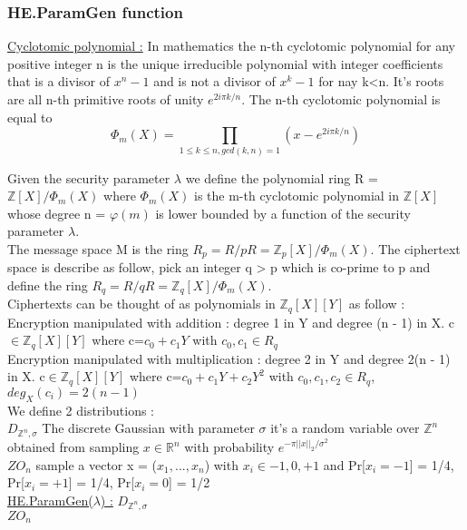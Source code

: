 \subsubsection{HE.ParamGen function}
\underline{Cyclotomic polynomial :}
In mathematics the n-th cyclotomic polynomial for any positive integer n is the unique irreducible polynomial with integer coefficients that is a divisor of $x^n-1$ and is not a divisor of $x^k-1$ for nay k<n. It's roots are all n-th primitive roots of unity $e^{2i\pi k/n}$. The n-th cyclotomic polynomial is equal to
\[ \Phi_m(X) = \prod_{1\leq k\leq n,  gcd(k,n) = 1} (x-e^{2i\pi k/n}) \]

Given the security parameter $\lambda$ we define the polynomial ring R = $\mathbb{Z}[X]/\Phi_m(X)$ where  $\Phi_m(X)$ is the m-th cyclotomic polynomial in $\mathbb{Z}[X]$ whose degree n = $\varphi(m)$ is lower bounded by a function of the security parameter $\lambda$. \\
The message space M is the ring $R_p = R/pR = \mathbb{Z}_p[X]/\Phi_m(X)$. The ciphertext space is describe as follow, pick an integer q > p which is co-prime to p and define the ring $R_q = R/qR = \mathbb{Z}_q[X]/\Phi_m(X)$.  \\
Ciphertexts can be thought of as polynomials in $\mathbb{Z}_q[X][Y]$ as follow :
Encryption manipulated with addition : degree 1 in Y and degree (n - 1) in X. c$\in \mathbb{Z}_q[X][Y]$ where c=$c_0 + c_1 Y$ with $c_0,c_1 \in R_q$ \\
Encryption manipulated with multiplication : degree 2 in Y and degree 2(n - 1) in X. c$\in \mathbb{Z}_q[X][Y]$ where c=$c_0 + c_1 Y + c_2 Y^2$ with $c_0,c_1,c_2 \in R_q$, $deg_X (c_i) = 2(n-1)$ \\
We define 2 distributions : \\
$D_{\mathbb{Z}^n, \sigma}$ The discrete Gaussian with parameter $\sigma$ it's a random variable over $\mathbb{Z}^n$ obtained from sampling $x\in \mathbb{R}^n$ with probability $e^{-\pi \lvert \lvert x \rvert \rvert_2 / \sigma^2}$ \\
$ZO_n$ sample a vector  x = ($x_1, ..., x_n$) with $x_i \in {-1, 0, +1}$ and Pr[$x_i=-1$] = 1/4, Pr[$x_i=+1$] = 1/4, Pr[$x_i=0$] = 1/2 \\
\underline{HE.ParamGen($\lambda$) :} 
\tabNormal $D_{\mathbb{Z}^n, \sigma}$ \\
\tabNormal $ZO_n$ \\